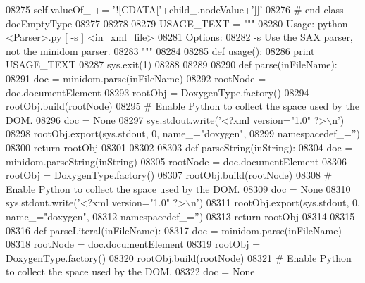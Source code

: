 \begin{DoxyCode}
{{{{{{{{{{{{{{{{{{{{{{{{{{{{{{{{{{{{{{{{{{{{{{{{{{{{{{{{{{{{{{{{{{{{{{{{{{{{{{{{{{{{{{{{{{{{{{{{{{{{{{{{{{{{{{{{{{{{{{{{{{{{{{{{{{{{{{{{{{{{{{{{{{{{{{{{{{{{{{{{{{{{{{{{{{{{{{{{{{{{{{{{{{{{{{{{{{{{{{{{{{{{{{{{{{{{{{{{{{{{{{{{{{{{{{{{{{{{{{{{{{{{{{{{{{{{{{{{{{{{{{{{{{{{{{{{{{{{{{{{{{{{{{{{{{{{{{{{{{{{{{{{{{{{{{{{{{{{{{{{{{{{{{{{{{{{{{{{{{{{{{{{{{{{{{{{{{{{{{{{{{{{{{{{{{{{{{{{{{{{{{{{{{{{{{{{{{{{{{{{{{{{{{{{{{{{{{{{{{{{{{{{{{{{{{{{{{{{{{{{{{{{{{{{{{{{{{{{{{{{{{{{{{{{{{{{{{{{{{{{{{{{{{{{{{{{{{{{{{{{{{{{{{{{08275             self.valueOf\_ += \textcolor{stringliteral}{'![CDATA['}+child\_.nodeValue+\textcolor{stringliteral}{']]'}
08276 \textcolor{comment}{# end class docEmptyType}
08277 
08278 
08279 USAGE\_TEXT = \textcolor{stringliteral}{"""}
08280 \textcolor{stringliteral}{Usage: python <Parser>.py [ -s ] <in\_xml\_file>}
08281 \textcolor{stringliteral}{Options:}
08282 \textcolor{stringliteral}{    -s        Use the SAX parser, not the minidom parser.}
08283 \textcolor{stringliteral}{"""}
08284 
08285 \textcolor{keyword}{def }usage():
08286     \textcolor{keywordflow}{print} USAGE\_TEXT
08287     sys.exit(1)
08288 
08289 
08290 \textcolor{keyword}{def }parse(inFileName):
08291     doc = minidom.parse(inFileName)
08292     rootNode = doc.documentElement
08293     rootObj = DoxygenType.factory()
08294     rootObj.build(rootNode)
08295     \textcolor{comment}{# Enable Python to collect the space used by the DOM.}
08296     doc = \textcolor{keywordtype}{None}
08297     sys.stdout.write(\textcolor{stringliteral}{'<?xml version="1.0" ?>\(\backslash\)n'})
08298     rootObj.export(sys.stdout, 0, name\_=\textcolor{stringliteral}{"doxygen"},
08299         namespacedef\_=\textcolor{stringliteral}{''})
08300     \textcolor{keywordflow}{return} rootObj
08301 
08302 
08303 \textcolor{keyword}{def }parseString(inString):
08304     doc = minidom.parseString(inString)
08305     rootNode = doc.documentElement
08306     rootObj = DoxygenType.factory()
08307     rootObj.build(rootNode)
08308     \textcolor{comment}{# Enable Python to collect the space used by the DOM.}
08309     doc = \textcolor{keywordtype}{None}
08310     sys.stdout.write(\textcolor{stringliteral}{'<?xml version="1.0" ?>\(\backslash\)n'})
08311     rootObj.export(sys.stdout, 0, name\_=\textcolor{stringliteral}{"doxygen"},
08312         namespacedef\_=\textcolor{stringliteral}{''})
08313     \textcolor{keywordflow}{return} rootObj
08314 
08315 
08316 \textcolor{keyword}{def }parseLiteral(inFileName):
08317     doc = minidom.parse(inFileName)
08318     rootNode = doc.documentElement
08319     rootObj = DoxygenType.factory()
08320     rootObj.build(rootNode)
08321     \textcolor{comment}{# Enable Python to collect the space used by the DOM.}
08322     doc = \textcolor{keywordtype}{None}
}}}}}}}}}}}}}}}}}}}}}}}}}}}}}}}}}}}}}}}}}}}}}}}}}}}}}}}}}}}}}}}}}}}}}}}}}}}}}}}}}}}}}}}}}}}}}}}}}}}}}}}}}}}}}}}}}}}}}}}}}}}}}}}}}}}}}}}}}}}}}}}}}}}}}}}}}}}}}}}}}}}}}}}}}}}}}}}}}}}}}}}}}}}}}}}}}}}}}}}}}}}}}}}}}}}}}}}}}}}}}}}}}}}}}}}}}}}}}}}}}}}}}}}}}}}}}}}}}}}}}}}}}}}}}}}}}}}}}}}}}}}}}}}}}}}}}}}}}}}}}}}}}}}}}}}}}}}}}}}}}}}}}}}}}}}}}}}}}}}}}}}}}}}}}}}}}}}}}}}}}}}}}}}}}}}}}}}}}}}}}}}}}}}}}}}}}}}}}}}}}}}}}}}}}}}}}}}}}}}}}}}}}}}}}}}}}}}}}}}}}}}}}}}}}}}}}}}}}}}}}}}}}}}}}}}}}}}}}}}}}}}}}}}}}}}}}}}}}}}}}}}}}}}}
\end{DoxyCode}
